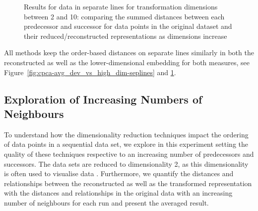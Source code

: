 \documentclass[pdftex,12pt,a4paper]{report}
\begin{document}
\begin{figure}
    \caption{Results for data in separate lines for transformation dimensions between 2 and 10: comparing the summed distances between each predecessor and successor for data points in the original dataset and their reduced/reconstructed representations as dimensions increase}\label{fig:cpca-avg_dev_vs_high_dim-cut-seplines}
\end{figure}

All methods keep the order-based distances on separate lines similarly in both the reconstructed as well as the lower-dimensional embedding for both measures, see Figure~\ref{fig:cpca-avg_dev_vs_high_dim-seplines} and \ref{fig:cpca-avg_dev_vs_high_dim-cut-seplines}.

\FloatBarrier
\subsection{Exploration of Increasing Numbers of Neighbours}
To understand how the dimensionality reduction techniques impact the ordering of data points in a sequential data set, we explore in this experiment setting the quality of these techniques respective to an increasing number of predecessors and successors.
The data sets are reduced to dimensionality 2, as this dimensionality is often used to visualise data \cite{2d-often}.
Furthermore, we quantify the distances and relationships between the reconstructed as well as the transformed representation with the distances and relationships in the original data with an increasing number of neighbours for each run and present the averaged result.
\end{document}
